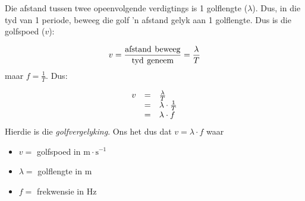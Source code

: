   
        \label{m38806*id319706}Die afstand tussen twee opeenvolgende verdigtings is 1 golflengte ($\lambda$). Dus, in die tyd van 1 periode, beweeg die golf 'n afstand gelyk aan 1 golflengte. Dus is die golfspoed ($v$):\par 
        \label{m38806*id319732}\nopagebreak\noindent{}
    \begin{equation*}
    v=\frac{\text{afstand}\phantom{\rule{4.pt}{0ex}}\text{beweeg}}{\text{tyd}\phantom{\rule{4.pt}{0ex}}\text{geneem}}=\frac{\lambda }{T}
      \end{equation*}
        \label{m38806*id319776}maar $f=\frac{1}{T}$. Dus:\par 
        \label{m38806*id319802}\nopagebreak\noindent{}
          
    \begin{equation*}
    \begin{array}{ccc}\hfill v& =& \frac{\lambda }{T}\hfill \\ & =& \lambda \ensuremath{\cdot}\frac{1}{T}\hfill \\ & =& \lambda \ensuremath{\cdot}f\hfill \end{array}
      \end{equation*}
        \label{m38806*id319870}Hierdie is die \textsl{golfvergelyking}. Ons het dus dat $v=\lambda \ensuremath{\cdot}f$ waar\par 
        \label{m38806*id319901}\begin{itemize}[noitemsep]
            \label{m38806*uid22}\item $v=$ golfspoed in $\text{m}\ensuremath{\cdot}\text{s}{}^{-1}$\label{m38806*uid23}\item $\lambda =$ golflengte in $\text{m}$
\item $f=$ frekwensie in $\text{Hz}$
\end{itemize}
\par


